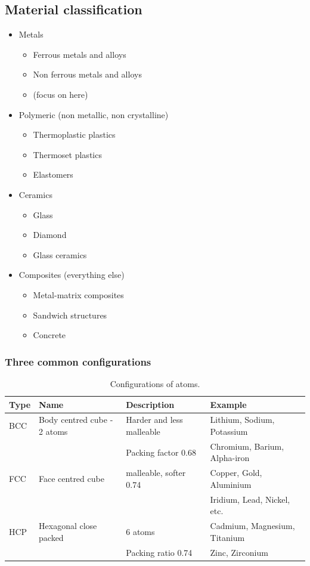 \subsection{Material classification}
\begin{itemize}
	\item Metals
	\begin{itemize}
		\item Ferrous metals and alloys
		\item Non ferrous metals and alloys
		\item (focus on here)
	\end{itemize}
	\item Polymeric (non metallic, non crystalline)
	\begin{itemize}
		\item Thermoplastic plastics
		\item Thermoset plastics
		\item Elastomers
	\end{itemize}
	\item Ceramics
	\begin{itemize}
		\item Glass
		\item Diamond
		\item Glass ceramics
	\end{itemize}
	\item Composites (everything else)
	\begin{itemize}
		\item Metal-matrix composites
		\item Sandwich structures
		\item Concrete
	\end{itemize}
\end{itemize}
\subsubsection{Three common configurations}
\begin{table}[H]
	\centering
	\begin{tabular}{@{}llll@{}}
		\toprule
		\textbf{Type} & \textbf{Name} & \textbf{Description} & \textbf{Example}\\
		\midrule
		BCC & Body centred cube - 2 atoms & Harder and less malleable & Lithium, Sodium, Potassium\\
		& & Packing factor 0.68 & Chromium, Barium, Alpha-iron\\
		FCC & Face centred cube & malleable, softer 0.74 & Copper, Gold, Aluminium\\
		& & & Iridium, Lead, Nickel, etc.\\
		HCP & Hexagonal close packed & 6 atoms & Cadmium, Magnesium, Titanium\\
		& & Packing ratio 0.74 & Zinc, Zirconium\\
		\bottomrule
	\end{tabular}
	\caption{Configurations of atoms.}
\end{table}
